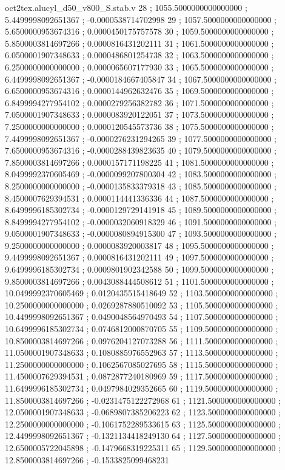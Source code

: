 \begin{filecontents}[overwrite]{oct2tex.alucyl_d50_v800_S.stab.v}
28 ; 1055.5000000000000000 ; 5.4499998092651367 ; -0.0000538714702998
29 ; 1057.5000000000000000 ; 5.6500000953674316 ; 0.0000450175757578
30 ; 1059.5000000000000000 ; 5.8500003814697266 ; 0.0000816431202111
31 ; 1061.5000000000000000 ; 6.0500001907348633 ; 0.0000486801254738
32 ; 1063.5000000000000000 ; 6.2500000000000000 ; 0.0000065607177930
33 ; 1065.5000000000000000 ; 6.4499998092651367 ; -0.0000184667405847
34 ; 1067.5000000000000000 ; 6.6500000953674316 ; 0.0000144962632476
35 ; 1069.5000000000000000 ; 6.8499994277954102 ; 0.0000279256382782
36 ; 1071.5000000000000000 ; 7.0500001907348633 ; 0.0000083920122051
37 ; 1073.5000000000000000 ; 7.2500000000000000 ; 0.0000120545573736
38 ; 1075.5000000000000000 ; 7.4499998092651367 ; -0.0000276231294265
39 ; 1077.5000000000000000 ; 7.6500000953674316 ; -0.0000288439823635
40 ; 1079.5000000000000000 ; 7.8500003814697266 ; 0.0000157171198225
41 ; 1081.5000000000000000 ; 8.0499992370605469 ; -0.0000099207800304
42 ; 1083.5000000000000000 ; 8.2500000000000000 ; -0.0000135833379318
43 ; 1085.5000000000000000 ; 8.4500007629394531 ; 0.0000114441336336
44 ; 1087.5000000000000000 ; 8.6499996185302734 ; -0.0000129729141918
45 ; 1089.5000000000000000 ; 8.8499994277954102 ; -0.0000032060918329
46 ; 1091.5000000000000000 ; 9.0500001907348633 ; -0.0000080894915300
47 ; 1093.5000000000000000 ; 9.2500000000000000 ; 0.0000083920003817
48 ; 1095.5000000000000000 ; 9.4499998092651367 ; 0.0000816431202111
49 ; 1097.5000000000000000 ; 9.6499996185302734 ; 0.0009801902342588
50 ; 1099.5000000000000000 ; 9.8500003814697266 ; 0.0043088444508612
51 ; 1101.5000000000000000 ; 10.0499992370605469 ; 0.0120435515418649
52 ; 1103.5000000000000000 ; 10.2500000000000000 ; 0.0269287880510092
53 ; 1105.5000000000000000 ; 10.4499998092651367 ; 0.0490048564970493
54 ; 1107.5000000000000000 ; 10.6499996185302734 ; 0.0746812000870705
55 ; 1109.5000000000000000 ; 10.8500003814697266 ; 0.0976204127073288
56 ; 1111.5000000000000000 ; 11.0500001907348633 ; 0.1080885976552963
57 ; 1113.5000000000000000 ; 11.2500000000000000 ; 0.1062567085027695
58 ; 1115.5000000000000000 ; 11.4500007629394531 ; 0.0872877240180969
59 ; 1117.5000000000000000 ; 11.6499996185302734 ; 0.0497984029352665
60 ; 1119.5000000000000000 ; 11.8500003814697266 ; -0.0231475122272968
61 ; 1121.5000000000000000 ; 12.0500001907348633 ; -0.0689807385206223
62 ; 1123.5000000000000000 ; 12.2500000000000000 ; -0.1061752289533615
63 ; 1125.5000000000000000 ; 12.4499998092651367 ; -0.1321134418249130
64 ; 1127.5000000000000000 ; 12.6500005722045898 ; -0.1479668319225311
65 ; 1129.5000000000000000 ; 12.8500003814697266 ; -0.1533825099468231

\end{filecontents}
